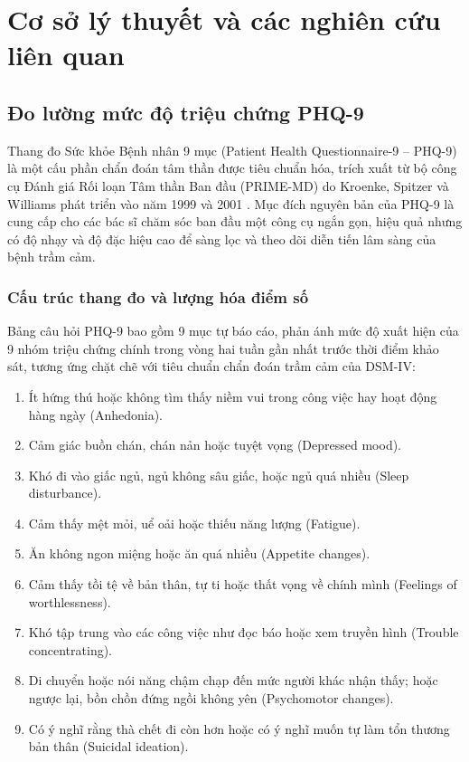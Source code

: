 \chapter{Cơ sở lý thuyết và các nghiên cứu liên quan}
\label{ch:co-so-ly-thuyet}

\section{Đo lường mức độ triệu chứng PHQ-9}
\label{sec:do-luong-phq9}

Thang đo Sức khỏe Bệnh nhân 9 mục (Patient Health Questionnaire-9 -- PHQ-9) là một cấu phần chẩn đoán tâm thần được tiêu chuẩn hóa, trích xuất từ bộ công cụ Đánh giá Rối loạn Tâm thần Ban đầu (PRIME-MD) do Kroenke, Spitzer và Williams phát triển vào năm 1999 và 2001 \cite{kroenke2001phq, spitzer1999validation}. Mục đích nguyên bản của PHQ-9 là cung cấp cho các bác sĩ chăm sóc ban đầu một công cụ ngắn gọn, hiệu quả nhưng có độ nhạy và độ đặc hiệu cao để sàng lọc và theo dõi diễn tiến lâm sàng của bệnh trầm cảm.

\subsection{Cấu trúc thang đo và lượng hóa điểm số}
Bảng câu hỏi PHQ-9 bao gồm 9 mục tự báo cáo, phản ánh mức độ xuất hiện của 9 nhóm triệu chứng chính trong vòng hai tuần gần nhất trước thời điểm khảo sát, tương ứng chặt chẽ với tiêu chuẩn chẩn đoán trầm cảm của DSM-IV:
\begin{enumerate}
    \item Ít hứng thú hoặc không tìm thấy niềm vui trong công việc hay hoạt động hàng ngày (Anhedonia).
    \item Cảm giác buồn chán, chán nản hoặc tuyệt vọng (Depressed mood).
    \item Khó đi vào giấc ngủ, ngủ không sâu giấc, hoặc ngủ quá nhiều (Sleep disturbance).
    \item Cảm thấy mệt mỏi, uể oải hoặc thiếu năng lượng (Fatigue).
    \item Ăn không ngon miệng hoặc ăn quá nhiều (Appetite changes).
    \item Cảm thấy tồi tệ về bản thân, tự ti hoặc thất vọng về chính mình (Feelings of worthlessness).
    \item Khó tập trung vào các công việc như đọc báo hoặc xem truyền hình (Trouble concentrating).
    \item Di chuyển hoặc nói năng chậm chạp đến mức người khác nhận thấy; hoặc ngược lại, bồn chồn đứng ngồi không yên (Psychomotor changes).
    \item Có ý nghĩ rằng thà chết đi còn hơn hoặc có ý nghĩ muốn tự làm tổn thương bản thân (Suicidal ideation).
\end{enumerate}

